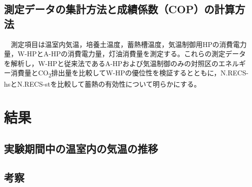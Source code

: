 \documentclass[
  japanese,
  11pt,
  letterpaper,
  DIV=11,
  numbers=noendperiod]{scrartcl}
\begin{document}
\begin{table}[H]

\caption{\label{tbl-exp_setting}各実験区における熱源の設定温度と栽培槽の制御温度}


\end{table}%

\subsection{測定データの集計方法と成績係数（COP）の計算方法}\label{ux6e2cux5b9aux30c7ux30fcux30bfux306eux96c6ux8a08ux65b9ux6cd5ux3068ux6210ux7e3eux4fc2ux6570copux306eux8a08ux7b97ux65b9ux6cd5}

　測定項目は温室内気温，培養土温度，蓄熱槽温度，気温制御用HPの消費電力量，W-HPとA-HPの消費電力量，灯油消費量を測定する。これらの測定データを解析し，W-HPと従来法であるA-HPおよび気温制御のみの対照区のエネルギー消費量とCO\textsubscript{2}排出量を比較してW-HPの優位性を検証するとともに，N.RECS-hsとN.RECS-stを比較して蓄熱の有効性について明らかにする。

\section{結果}\label{ux7d50ux679c}

\subsection{実験期間中の温室内の気温の推移}\label{ux5b9fux9a13ux671fux9593ux4e2dux306eux6e29ux5ba4ux5185ux306eux6c17ux6e29ux306eux63a8ux79fb}

\subsection{考察}\label{ux8003ux5bdf}
\end{document}
